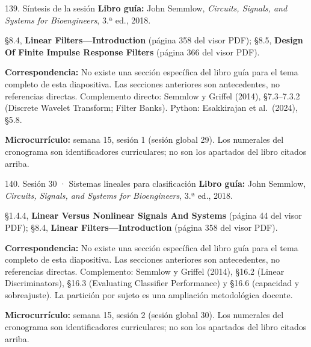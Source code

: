\documentclass[
  10pt,
  ignorenonframetext,
  aspectratio=169,
  spanish,
]{beamer}
\begin{document}
\begin{frame}{139. Síntesis de la sesión}
\label{suxedntesis-de-la-sesiuxf3n-8}
\textbf{Libro guía:} John Semmlow, \emph{Circuits, Signals, and Systems
for Bioengineers}, 3.ª ed., 2018.

§8.4, \textbf{Linear Filters---Introduction} (página 358 del visor PDF);
§8.5, \textbf{Design Of Finite Impulse Response Filters} (página 366 del
visor PDF).

\textbf{Correspondencia:} No existe una sección específica del libro
guía para el tema completo de esta diapositiva. Las secciones anteriores
son antecedentes, no referencias directas. Complemento directo: Semmlow
y Griffel (2014), §7.3--7.3.2 (Discrete Wavelet Transform; Filter
Banks). Python: Esakkirajan et al.~(2024), §5.8.

\textbf{Microcurrículo:} semana 15, sesión 1 (sesión global 29). Los
numerales del cronograma son identificadores curriculares; no son los
apartados del libro citados arriba.
\end{frame}

\begin{frame}{140. Sesión 30 · Sistemas lineales para clasificación}
\label{sesiuxf3n-30-sistemas-lineales-para-clasificaciuxf3n}
\textbf{Libro guía:} John Semmlow, \emph{Circuits, Signals, and Systems
for Bioengineers}, 3.ª ed., 2018.

§1.4.4, \textbf{Linear Versus Nonlinear Signals And Systems} (página 44
del visor PDF); §8.4, \textbf{Linear Filters---Introduction} (página 358
del visor PDF).

\textbf{Correspondencia:} No existe una sección específica del libro
guía para el tema completo de esta diapositiva. Las secciones anteriores
son antecedentes, no referencias directas. Complemento: Semmlow y
Griffel (2014), §16.2 (Linear Discriminators), §16.3 (Evaluating
Classifier Performance) y §16.6 (capacidad y sobreajuste). La partición
por sujeto es una ampliación metodológica docente.

\textbf{Microcurrículo:} semana 15, sesión 2 (sesión global 30). Los
numerales del cronograma son identificadores curriculares; no son los
apartados del libro citados arriba.
\end{frame}
\end{document}
